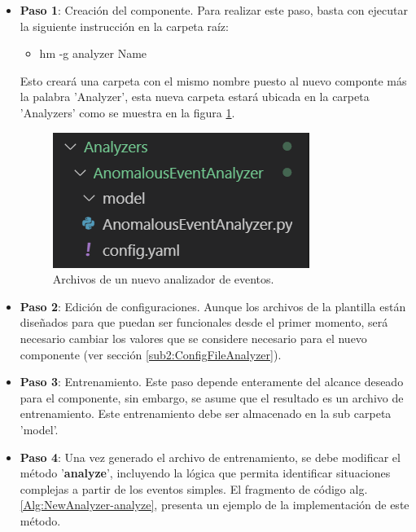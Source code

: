         \begin{itemize}
            \item \textbf{Paso 1}: Creación del componente. Para realizar este paso, basta con ejecutar la siguiente instrucción en la carpeta raíz:
            \begin{itemize}
                \item hm -g analyzer Name
            \end{itemize}
            Esto creará una carpeta con el mismo nombre puesto al nuevo componte más la palabra 'Analyzer', esta nueva carpeta estará ubicada en la carpeta 'Analyzers' como se muestra en la figura \ref{fig:NewAnalyzer}.
    
            \begin{figure}[ht!]
            	\centering
            	\includegraphics[width=0.4\linewidth]{imgs/03-Architecture/03-NewAnalyzer.png}
            	\caption[Archivos de un nuevo analizado de eventos]{Archivos de un nuevo analizador de eventos.}
        	    \label{fig:NewAnalyzer}
            \end{figure}%
            
            \item \textbf{Paso 2}: Edición de configuraciones. Aunque los archivos de la plantilla están diseñados para que puedan ser funcionales desde el primer momento, será necesario cambiar los valores que se considere necesario para el nuevo componente (ver sección \ref{sub2:ConfigFileAnalyzer}).
            
            \item \textbf{Paso 3}: Entrenamiento. Este paso depende enteramente del alcance deseado para el componente, sin embargo, se asume que el resultado es un archivo de entrenamiento. Este entrenamiento debe ser almacenado en la sub carpeta 'model'.
            
            \item \textbf{Paso 4}: Una vez generado el archivo de entrenamiento, se debe modificar el método '\textbf{analyze}', incluyendo la lógica que permita identificar situaciones complejas a partir de los eventos simples. El fragmento de código alg. \ref{Alg:NewAnalyzer-analyze}, presenta un ejemplo de la implementación de este método.


\end{itemize}
